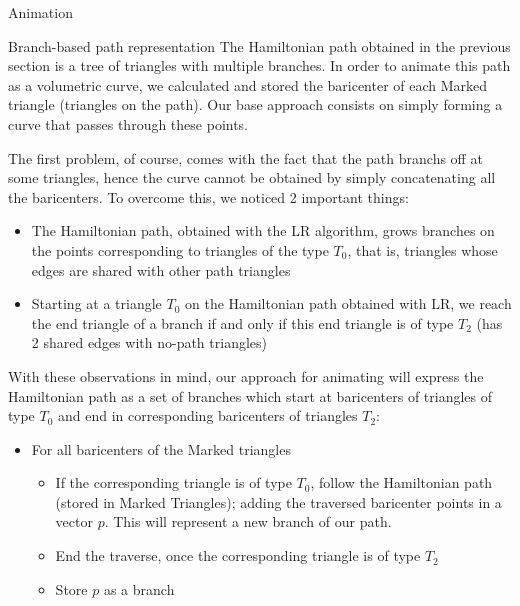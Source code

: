 \documentclass[conference]{IEEEtran}
\makeatletter
\renewcommand\section{\@startsection{section}{1}{\z@}
                                  {-3.0ex plus -1.5ex minus -0.5ex}
                                  {0.7ex plus 1ex minus 0ex}
                                  {\bfseries}}
\renewcommand\subsection{\@startsection{subsection}{1}{\z@}
                                  {-2.0ex plus -1.5ex minus -0.5ex}
                                  {0.7ex plus 1ex minus 0ex}
                                  {\itshape\bfseries}}
\makeatother
\begin{document}
\section{Animation}
\label{sec:Approach}

\subsection{Branch-based path representation}
The Hamiltonian path obtained in the previous section is a tree of triangles with multiple branches.
In order to animate this path as a volumetric curve, we calculated and stored the baricenter of each Marked triangle (triangles on the path). Our base approach consists on simply forming a curve that passes
through these points.

The first problem, of course, comes with the fact that the path branchs off at some triangles, hence the curve cannot be obtained by simply concatenating all the baricenters. To overcome this, we noticed 2 important things:

\begin{itemize}
\item{The Hamiltonian path, obtained with the LR algorithm, grows branches on the points corresponding to triangles of the type $T_{0}$, that is, triangles whose edges are shared with other path triangles}
\item{Starting at a triangle $T_{0}$ on the Hamiltonian path obtained with LR, we reach the end triangle of a branch if and only if this end triangle is of type $T_{2}$ (has 2 shared edges with no-path triangles) }
\end{itemize}

With these observations in mind, our approach for animating will express the Hamiltonian path as a set of branches which start at baricenters of triangles of type $T_{0}$ and end in corresponding baricenters of triangles $T_{2}$:

\begin{itemize}
\item{For all baricenters of the Marked triangles
\begin{itemize}
\item{If the corresponding triangle is of type $T_{0}$, follow the Hamiltonian path (stored in Marked Triangles); adding the traversed baricenter points in a vector $p$. This will represent a new branch of our path. }
\item{End the traverse, once the corresponding triangle is of type $T_{2}$}
\item{Store $p$ as a branch}
\end{itemize}
}
\end{itemize} 
\end{document}
